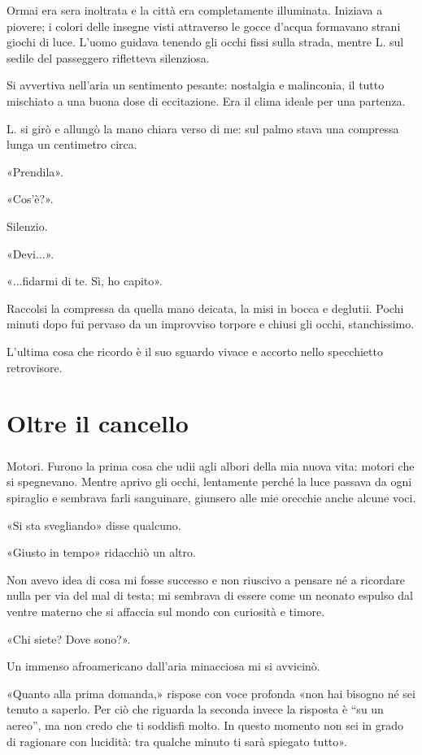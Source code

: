 \documentclass[a4paper,12pt]{book}
\begin{document}
Ormai era sera inoltrata e la città era completamente illuminata. Iniziava a
piovere; i colori delle insegne visti attraverso le gocce d'acqua formavano
strani giochi di luce. L'uomo guidava tenendo gli occhi fissi sulla strada,
mentre L. sul sedile del passeggero rifletteva silenziosa.

Si avvertiva nell'aria un sentimento pesante: nostalgia e malinconia, il tutto
mischiato a una buona dose di eccitazione. Era il clima ideale per una partenza.

L. si girò e allungò la mano chiara verso di me: sul palmo stava una compressa
lunga un centimetro circa.

«Prendila».

«Cos'è?».

Silenzio.

«Devi...».

«...fidarmi di te. Sì, ho capito».

Raccolsi la compressa da quella mano deicata, la misi in bocca e deglutii. Pochi
minuti dopo fui pervaso da un improvviso torpore e chiusi gli occhi,
stanchissimo.

L'ultima cosa che ricordo è il suo sguardo vivace e accorto nello specchietto
retrovisore.

\chapter{Oltre il cancello}

\paragraph{}
Motori. Furono la prima cosa che udii agli albori della mia nuova vita: motori
che si spegnevano. Mentre aprivo gli occhi, lentamente perché la luce passava
da ogni spiraglio e sembrava farli sanguinare, giunsero alle mie orecchie anche
alcune voci.

«Si sta svegliando» disse qualcuno.

«Giusto in tempo» ridacchiò un altro.

Non avevo idea di cosa mi fosse successo e non riuscivo a pensare né a ricordare
nulla per via del mal di testa; mi sembrava di essere come un neonato espulso
dal ventre materno che si affaccia sul mondo con curiosità e timore.

«Chi siete? Dove sono?».

Un immenso afroamericano dall'aria minacciosa mi si avvicinò.

«Quanto alla prima domanda,» rispose con voce profonda «non hai bisogno né sei
tenuto a saperlo. Per ciò che riguarda la seconda invece la risposta è ``su un
aereo'', ma non credo che ti soddisfi molto. In questo momento non sei in grado
di ragionare con lucidità: tra qualche minuto ti sarà spiegato tutto».
\end{document}
